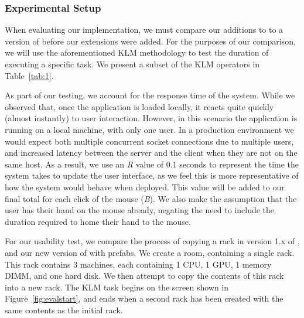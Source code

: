 \documentclass[11pt]{article}
\begin{document}
		\subsubsection{Experimental Setup}
			When evaluating our implementation, we must compare our additions to \opendc{} to a version of \opendc{} before our extensions were added.
			For the purposes of our comparison, we will use the aforementioned KLM methodology to test the duration of executing a specific task.
			We present a subset of the KLM operators in Table~\ref{tab:1}.

			As part of our testing, we account for the response time of the system. 
			While we observed that, once the application is loaded locally, it reacts quite quickly (almost instantly) to user interaction.
			However, in this scenario the application is running on a local machine, with only one user.
			In a production environment we would expect both multiple concurrent socket connections due to multiple users, and increased latency between the server and the client when they are not on the same host. 
			As a result, we use an \textit{R} value of 0.1 seconds to represent the time the system takes to update the user interface, as we feel this is more representative of how the system would behave when deployed.
			This value will be added to our final total for each click of the mouse (\textit{B}).
			We also make the assumption that the user has their hand on the mouse already, negating the need to include the duration required to home their hand to the mouse.

			For our usability test, we compare the process of copying a rack in version 1.x of \opendc{}, and our new version of \opendc{} with prefabs.
			We create a room, containing a single rack.
			This rack contains 3 machines, each containing 1 CPU, 1 GPU, 1 memory DIMM, and one hard disk.
			We then attempt to copy the contents of this rack into a new rack.
			The KLM task begins on the screen shown in Figure~\ref{fig:evalstart}, and ends when a second rack has been created with the same contents as the initial rack.
			
\end{document}
